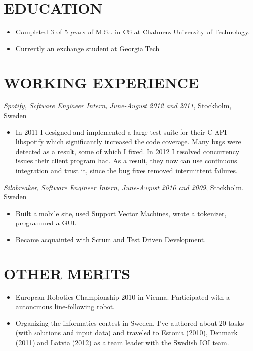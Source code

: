 \documentclass[11pt]{res} %
\begin{document}
\begin{resume}
\section{EDUCATION}
 \begin{itemize} %
   \item Completed 3 of 5 years of M.Sc. in CS
  at Chalmers University of Technology.

   \item Currently an exchange student at Georgia Tech
 \end{itemize}

\section{WORKING EXPERIENCE}
\emph{Spotify, Software Engineer Intern, June-August 2012 and 2011}, Stockholm, Sweden
\vspace{0.2in}
   \begin{itemize} %
   \item In 2011 I designed and implemented a large test suite for their C API
     libspotify which significantly increased the code coverage. Many bugs were
     detected as a result, some of which I fixed. In 2012 I resolved
     concurrency issues their client program had. As a result, they now can use
     continuous integration and trust it, since the bug fixes removed
     intermittent failures.

 \end{itemize}


\emph{Silobreaker, Software Engineer Intern, June-August 2010 and 2009}, Stockholm, Sweden
\vspace{0.2in}
 \begin{itemize} %
  \item Built a mobile site, used Support Vector Machines, wrote a tokenizer,
   programmed a GUI.
  \item Became acquainted with Scrum and Test Driven Development.
\end{itemize}

\section{OTHER MERITS}

   \begin{itemize} %
   \item European Robotics Championship 2010 in Vienna.
    Participated with a autonomous line-following robot.
   \item Organizing the informatics contest in Sweden.  I've authored about
     20 tasks (with solutions and input data) and traveled to Estonia (2010),
     Denmark (2011) and Latvia (2012) as a team leader with the Swedish IOI
     team.
 \end{itemize}

\end{resume}
\end{document}

